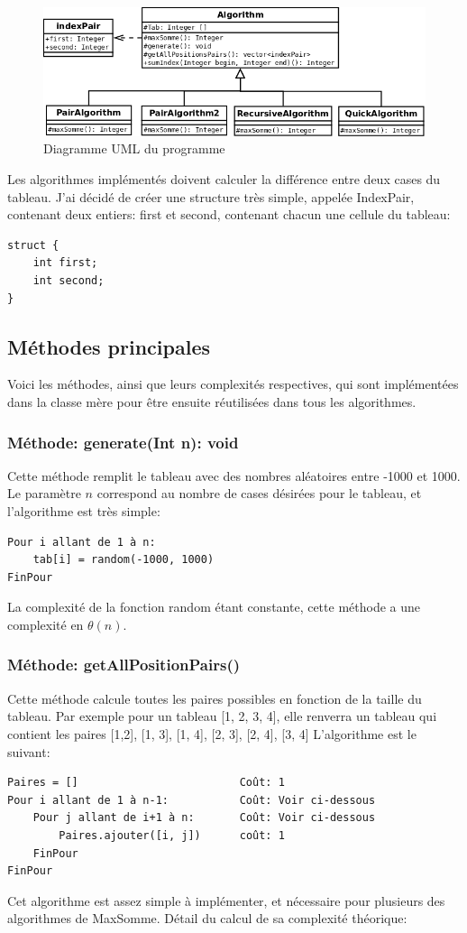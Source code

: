 \documentclass[a4paper, 12pt]{article}
\begin{document}
\begin{figure}[h]
	\centering
	\includegraphics[scale=0.3]{diagramme.png}
	\caption{Diagramme UML du programme}
	\label{uml}	
\end{figure}

 
Les algorithmes implémentés doivent calculer la différence entre deux cases du tableau. J'ai décidé de créer une structure très simple, appelée IndexPair, contenant deux entiers: first et second, contenant chacun une cellule du tableau:
\begin{verbatim}
struct {
    int first;
    int second;
}
\end{verbatim}

\subsection{Méthodes principales}
Voici les méthodes, ainsi que leurs complexités respectives, qui sont implémentées dans la classe mère pour être ensuite réutilisées dans tous les algorithmes.
\subsubsection{Méthode: generate(Int n): void}
Cette méthode remplit le tableau avec des nombres aléatoires entre -1000 et 1000. Le paramètre $n$ correspond au nombre de cases désirées pour le tableau, et l'algorithme est très simple:
\begin{verbatim}
Pour i allant de 1 à n:
    tab[i] = random(-1000, 1000)
FinPour
\end{verbatim}
La complexité de la fonction random étant constante, cette méthode a une complexité en $\theta (n)$.

\subsubsection{Méthode: getAllPositionPairs()}
Cette méthode calcule toutes les paires possibles en fonction de la taille du tableau. Par exemple pour un tableau [1, 2, 3, 4], elle renverra un tableau qui contient les paires {[1,2], [1, 3], [1, 4], [2, 3], [2, 4], [3, 4]}
L'algorithme est le suivant:
\begin{verbatim}
Paires = []                         Coût: 1 
Pour i allant de 1 à n-1:           Coût: Voir ci-dessous
    Pour j allant de i+1 à n:       Coût: Voir ci-dessous
        Paires.ajouter([i, j])      coût: 1
    FinPour
FinPour
\end{verbatim}
Cet algorithme est assez simple à implémenter, et nécessaire pour plusieurs des algorithmes de MaxSomme. 
Détail du calcul de sa complexité théorique:
\end{document}
